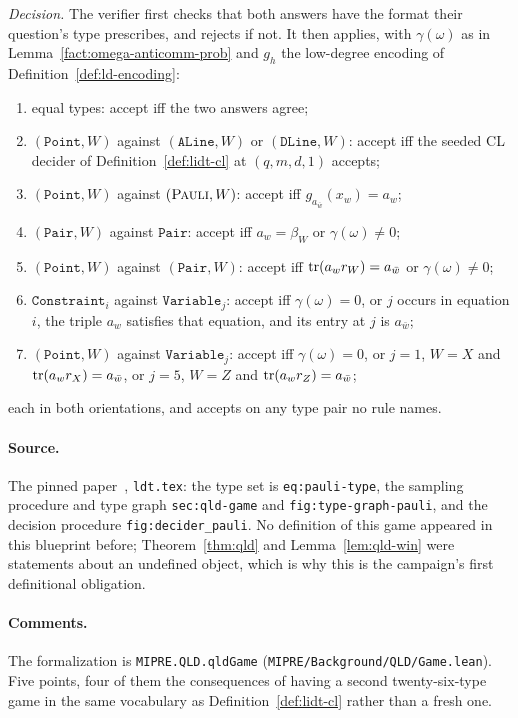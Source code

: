 \begin{definition}
\emph{Decision.} The verifier first checks that both answers have the format their question's
type prescribes, and rejects if not. It then applies, with $\gamma(\omega)$ as in
Lemma~\ref{fact:omega-anticomm-prob} and $g_h$ the low-degree encoding of
Definition~\ref{def:ld-encoding}:
\begin{enumerate}
\item equal types: accept iff the two answers agree;
\item $(\mathtt{Point}, W)$ against $(\mathtt{ALine}, W)$ or $(\mathtt{DLine}, W)$: accept iff
  the seeded CL decider of Definition~\ref{def:lidt-cl} at $(q, m, d, 1)$ accepts;
\item $(\mathtt{Point}, W)$ against $(\textsc{Pauli}, W)$: accept iff $g_{a_{\bar w}}(x_w) = a_w$;
\item $(\mathtt{Pair}, W)$ against $\mathtt{Pair}$: accept iff $a_w = \beta_W$ or
  $\gamma(\omega) \neq 0$;
\item $(\mathtt{Point}, W)$ against $(\mathtt{Pair}, W)$: accept iff
  $\operatorname{tr}(a_w r_W) = a_{\bar w}$ or $\gamma(\omega) \neq 0$;
\item $\mathtt{Constraint}_i$ against $\mathtt{Variable}_j$: accept iff $\gamma(\omega) = 0$,
  or $j$ occurs in equation $i$, the triple $a_w$ satisfies that equation, and its entry at
  $j$ is $a_{\bar w}$;
\item $(\mathtt{Point}, W)$ against $\mathtt{Variable}_j$: accept iff $\gamma(\omega) = 0$, or
  $j = 1$, $W = X$ and $\operatorname{tr}(a_w r_X) = a_{\bar w}$, or $j = 5$, $W = Z$ and
  $\operatorname{tr}(a_w r_Z) = a_{\bar w}$;
\end{enumerate}
each in both orientations, and accepts on any type pair no rule names.
\end{definition}

\paragraph{Source.} The pinned paper~\cite{AuditSync26}, \texttt{ldt.tex}: the type set is
\texttt{eq:pauli-type}, the sampling procedure and type graph \texttt{sec:qld-game} and
\texttt{fig:type-graph-pauli}, and the decision procedure \texttt{fig:decider\_pauli}. No
definition of this game appeared in this blueprint before; Theorem~\ref{thm:qld} and
Lemma~\ref{lem:qld-win} were statements about an undefined object, which is why this is the
campaign's first definitional obligation.

\paragraph{Comments.} The formalization is \texttt{MIPRE.QLD.qldGame}
(\texttt{MIPRE/Background/QLD/Game.lean}). Five points, four of them the consequences of
having a second twenty-six-type game in the same vocabulary as Definition~\ref{def:lidt-cl}
rather than a fresh one.

